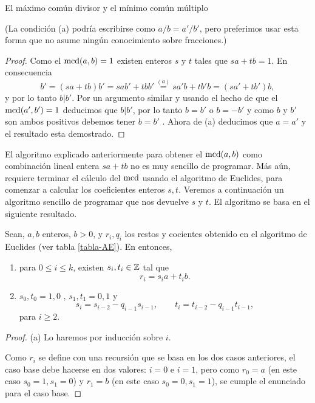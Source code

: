 \begin{section}{El máximo común divisor y el mínimo común
múltiplo}
\begin{ejemplo}
(La condición ({a}) podría escribirse como $a/b=a'/b'$, pero
preferimos usar esta forma que no asume ningún conocimiento sobre
fracciones.)
\end{ejemplo}
\begin{proof} Como el $\operatorname{mcd} (a,b) =1$ existen enteros $s$ y $t$
tales que $sa+tb=1$. En consecuencia
$$
b'=(sa+tb)b' =sab'+tbb' \overset{(a)}{=} sa'b + tb'b = (sa'+tb')b,
$$
y por lo tanto $b|b'$. Por un argumento similar y usando el hecho
de que el $\operatorname{mcd}(a',b')=1 $ deducimos que $b|b'$, por lo tanto
$b=b'$ o $b=-b'$ y como $b $ y $b'$ son ambos positivos debemos
tener $b=b'$ . Ahora de (a) deducimos que $a=a'$ y el resultado
esta demostrado.
\end{proof}


\begin{observacion}[*]
El  algoritmo explicado anteriormente para obtener el $\operatorname{mcd}(a,b)$ como combinación lineal entera $sa+tb$ no es muy sencillo de programar. Más aún, requiere terminar el cálculo del $\operatorname{mcd}$ usando el algoritmo de Euclides, para comenzar a calcular los coeficientes enteros $s,t$. Veremos a continuación un algoritmo sencillo de programar que nos devuelve $s$ y $t$. El algoritmo se basa en el siguiente resultado. 

\begin{proposicion}\label{prop-alg-euclides-2} Sean, $a,b$ enteros, $b>0$, y $r_i, q_i$ los restos y cocientes obtenido en el algoritmo de Euclides (ver tabla \ref{tabla-AE}). En entonces, 
\begin{enumerate}[label=(\alph*)]
	\item 	para $0 \le i \le k$,  existen $s_i, t_i \in {\mathbb Z}$ tal que
	\begin{equation*}
	r_i = s_ia + t_ib.
	\end{equation*}
	\item $s_0, t_0 = 1, 0$ , $s_1, t_1 = 0, 1$ y 
	\begin{equation}
	s_{i} = s_{i-2} - q_{i-1}  s_{i-1}, \qquad t_{i} = t_{i-2} - q_{i-1}  t_{i-1},
	\end{equation}
	para $i \ge 2$.
\end{enumerate}
\end{proposicion}
\begin{proof}
	(a) Lo haremos por inducción sobre $i$.
	
	Como $r_i$ se define con una recursión que se basa en los dos casos anteriores, el caso base debe hacerse en dos valores: $i=0$ e $i=1$, pero como  $r_0 = a$ (en este caso $s_0=1, s_1 =0$) y $r_1 =b$ (en este caso $s_0=0, s_1 =1$), se cumple el enunciado para el caso base. 
	

\end{proof}
\end{observacion}
\end{section}

